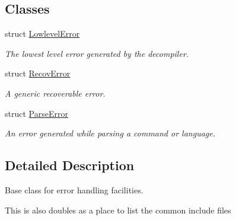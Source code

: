 \subsection*{Classes}
\begin{DoxyCompactItemize}
\item 
struct \mbox{\hyperlink{struct_lowlevel_error}{Lowlevel\+Error}}
\begin{DoxyCompactList}\small\item\em The lowest level error generated by the decompiler. \end{DoxyCompactList}\item 
struct \mbox{\hyperlink{struct_recov_error}{Recov\+Error}}
\begin{DoxyCompactList}\small\item\em A generic recoverable error. \end{DoxyCompactList}\item 
struct \mbox{\hyperlink{struct_parse_error}{Parse\+Error}}
\begin{DoxyCompactList}\small\item\em An error generated while parsing a command or language. \end{DoxyCompactList}\end{DoxyCompactItemize}


\subsection{Detailed Description}
Base class for error handling facilities. 

This is also doubles as a place to list the common include files 